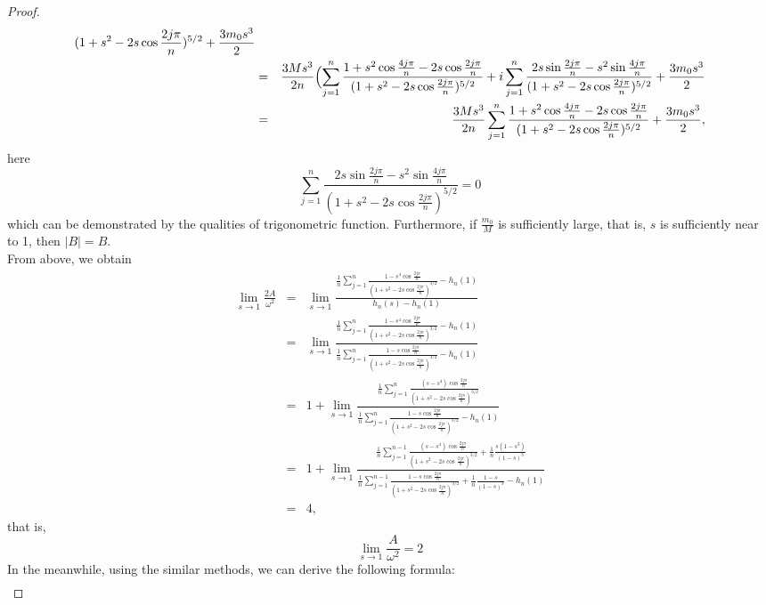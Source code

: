 \documentclass[11pt]{article}
\begin{document}
\begin{proof}
\begin{eqnarray*}
   {(1+s^2-2s\cos{\frac{2j\pi}{n}})^{5/2}}+\frac{3m_0s^3}{2}\\
   &=&\frac{3Ms^3}{2n}
   \Bigl(
   \sum_{j=1}^{n}
   \frac{1+s^2\cos{\frac{4j\pi}{n}}-2s\cos{\frac{2j\pi}{n}}}
   {(1+s^2-2s\cos{\frac{2j\pi}{n}})^{5/2}}
   +i
   \sum_{j=1}^{n}
   \frac{2s\sin{\frac{2j\pi}{n}}-s^2\sin{\frac{4j\pi}{n}}}
   {(1+s^2-2s\cos{\frac{2j\pi}{n}})^{5/2}}
   +\frac{3m_0s^3}{2}\\
   &=&\frac{3Ms^3}{2n}
   \sum_{j=1}^{n}
   \frac{1+s^2\cos{\frac{4j\pi}{n}}-2s\cos{\frac{2j\pi}{n}}}
   {(1+s^2-2s\cos{\frac{2j\pi}{n}})^{5/2}}
   +\frac{3m_0s^3}{2},
    \end{eqnarray*}
     here
   $$
    \sum_{j=1}^{n}
   \frac{2s\sin{\frac{2j\pi}{n}}-s^2\sin{\frac{4j\pi}{n}}}
   {(1+s^2-2s\cos{\frac{2j\pi}{n}})^{5/2}}=0
   $$
   which can be demonstrated by the qualities of trigonometric function.
   Furthermore, if $\frac{m_0}{M}$ is sufficiently large, that is, $s$ is sufficiently near to 1, then 
   $|B|=B$.
   \\
   From above, we obtain
\begin{eqnarray*}
    \lim_{s\to 1}\frac{2A}{\omega^2}&=&\lim_{s\to 1}\frac{\frac{1}{n}\sum_{j=1}^{n}\frac{1-s^4\cos{\frac{2j\pi}{n}}}{(1+s^2-2s\cos{\frac{2j\pi}{n}})^{3/2}}-h_n(1)}
    {h_n(s)-h_n(1)}\\
    &=&\lim_{s\to 1}
    \frac{
    \frac{1}{n}\sum_{j=1}^{n}\frac{1-s^4\cos{\frac{2j\pi}{n}}}{(1+s^2-2s\cos{\frac{2j\pi}{n}})^{3/2}}-h_n(1)
    }
    {
    \frac{1}{n}\sum_{j=1}^{n}\frac{1-s\cos{\frac{2j\pi}{n}}}{(1+s^2-2s\cos{\frac{2j\pi}{n}})^{3/2}}
    -h_n(1)
    }\\
   &=&1+\lim_{s\to 1}\frac{
    \frac{1}{n}\sum_{j=1}^{n}\frac{(s-s^4)\cos{\frac{2j\pi}{n}}}{(1+s^2-2s\cos{\frac{2j\pi}{n}})^{3/2}}
   }
   {
    \frac{1}{n}\sum_{j=1}^{n}\frac{1-s\cos{\frac{2j\pi}{n}}}{(1+s^2-2s\cos{\frac{2j\pi}{n}})^{3/2}}
    -h_n(1)
   }\\
   &=&1+\lim_{s\to 1}\frac{
    \frac{1}{n}\sum_{j=1}^{n-1}\frac{(s-s^4)\cos{\frac{2j\pi}{n}}}{(1+s^2-2s\cos{\frac{2j\pi}{n}})^{3/2}}
   +\frac{1}{n}\frac{s(1-s^3)}{(1-s)^3}
   }
   {
    \frac{1}{n}\sum_{j=1}^{n-1}\frac{1-s\cos{\frac{2j\pi}{n}}}{(1+s^2-2s\cos{\frac{2j\pi}{n}})^{3/2}}
    +\frac{1}{n}\frac{1-s}{(1-s)^3}
    -h_n(1)
   }\\
   &=&4,
\end{eqnarray*}
that is,
$$
\lim_{s\to1}\frac{A}{\omega^2}=2
$$
In the meanwhile, using the similar methods, we can derive the following formula:
   \begin{eqnarray*}

\end{eqnarray*}
\end{proof}
\end{document}
